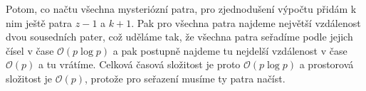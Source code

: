 \documentclass{fkssolpub}
\author{Ondřej Sedláček}
\begin{document}
Potom, co načtu všechna mysteriózní patra, pro zjednodušení výpočtu přidám k nim
ještě patra $z - 1$ a $k + 1$. Pak pro všechna patra najdeme největší vzdálenost
dvou sousedních pater, což uděláme tak, že všechna patra seřadíme podle jejich čísel
v čase $\mathcal{O}(p \log p)$ a pak postupně najdeme tu nejdelší vzdálenost v čase
$\mathcal{O}(p)$ a tu vrátíme. Celková časová složitost je proto $\mathcal{O}(p \log p)$
a prostorová složitost je $\mathcal{O}(p)$, protože pro seřazení musíme ty patra
načíst.
\end{document}
